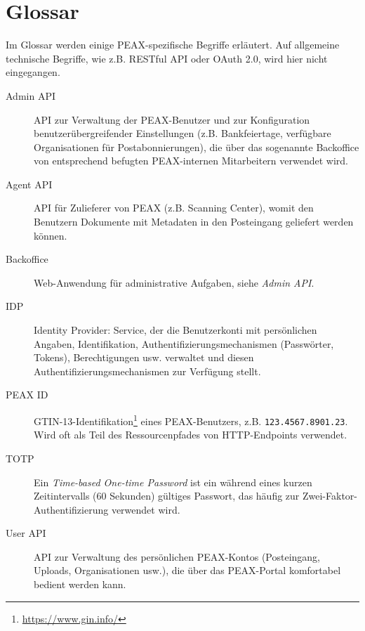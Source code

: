 \section*{Glossar}

Im Glossar werden einige PEAX-spezifische Begriffe erläutert. Auf allgemeine technische Begriffe, wie z.B. RESTful API oder OAuth 2.0, wird hier nicht eingegangen.

\begin{description}
    \item[Admin API] API zur Verwaltung der PEAX-Benutzer und zur Konfiguration benutzerübergreifender Einstellungen (z.B. Bankfeiertage, verfügbare Organisationen für Postabonnierungen), die über das sogenannte Backoffice von entsprechend befugten PEAX-internen Mitarbeitern verwendet wird.
    \item[Agent API] API für Zulieferer von PEAX (z.B. Scanning Center), womit den Benutzern Dokumente mit Metadaten in den Posteingang geliefert werden können.
    \item[Backoffice] Web-Anwendung für administrative Aufgaben, siehe \textit{Admin API}.
    \item[IDP] Identity Provider: Service, der die Benutzerkonti mit persönlichen Angaben, Identifikation, Authentifizierungsmechanismen (Passwörter, Tokens), Berechtigungen usw. verwaltet und diesen Authentifizierungsmechanismen zur Verfügung stellt.
    \item[PEAX ID] GTIN-13-Identifikation\footnote{\url{https://www.gin.info/}} eines PEAX-Benutzers, z.B. \texttt{123.4567.8901.23}. Wird oft als Teil des Ressourcenpfades von HTTP-Endpoints verwendet.
    \item[TOTP] Ein \textit{Time-based One-time Password} ist ein während eines kurzen Zeitintervalls (60 Sekunden) gültiges Passwort, das häufig zur Zwei-Faktor-Authentifizierung verwendet wird.
    \item[User API] API zur Verwaltung des persönlichen PEAX-Kontos (Posteingang, Uploads, Organisationen usw.), die über das PEAX-Portal komfortabel bedient werden kann.
\end{description}
